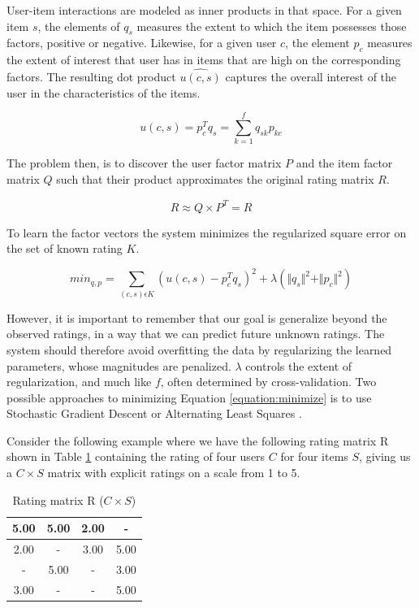 User-item interactions are modeled as inner products in that space. For a given
item $s$, the elements of $q_{s}$ measures the extent to which the item
possesses those factors, positive or negative. Likewise, for a given user $c$,
the element $p_{c}$ measures the extent of interest that user has in items that
are high on the corresponding factors. The resulting dot product $\hat{u(c,s)}$
captures the overall interest of the user in the characteristics of the items.

\begin{equation}
u(c,s) = p_{c}^{T}q_{s} = \sum_{k=1}^{f} q_{sk}p_{kc}
\end{equation}

The problem then, is to discover the user factor matrix $P$ and the item factor
matrix $Q$ such that their product approximates the original rating matrix $R$.

\begin{equation}
R \approx Q \times P^{T} = \hat{R}
\end{equation}

To learn the factor vectors the system minimizes the regularized square error
on the set of known rating $K$.

\begin{equation}
\label{equation:minimize}
min_{q, p} = \sum_{(c,s)\epsilon K} (u(c,s) - p^{T}_{c}q_{s})^{2} + \lambda ( \Vert q_{s} \Vert ^{2} + \Vert p_{c} \Vert ^{2})
\end{equation}

However, it is important to remember that our goal is generalize beyond the
observed ratings, in a way that we can predict future unknown ratings. The
system should therefore avoid overfitting the data by regularizing the learned
parameters, whose magnitudes are penalized. $\lambda$ controls the extent of
regularization, and much like $f$, often determined by cross-validation. Two
possible approaches to minimizing Equation \ref{equation:minimize} is to use
Stochastic Gradient Descent or Alternating Least Squares \citep{Koren2009}.

Consider the following example where we have the following rating matrix R
shown in Table \ref{table:ratingMatrix} containing the rating of four users $C$
for four items $S$, giving us a $C \times S$ matrix with explicit ratings on a
  scale from 1 to 5.

\begin{table}[!htbp]
    \centering
    \begin{tabular}{|c|c|c|c|}
    \hline
    5.00    & 5.00  & 2.00 & -    \\ \hline
    2.00    & -     & 3.00 & 5.00 \\ \hline
     -      & 5.00  & -    & 3.00 \\ \hline
    3.00    & -     & -    & 5.00 \\ \hline
    \end{tabular}
    \caption{Rating matrix R ($C \times S$)}
    \label{table:ratingMatrix}
\end{table}

